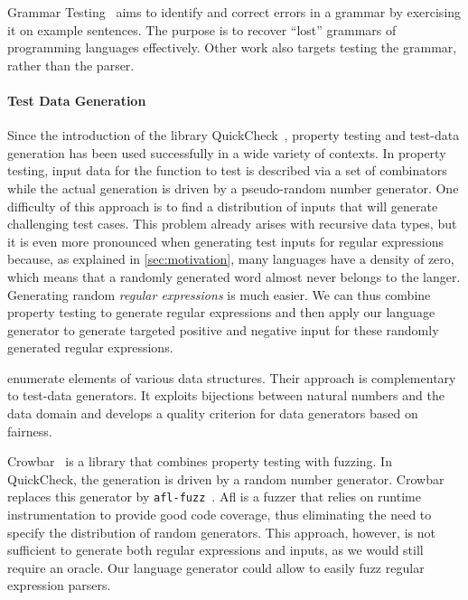 Grammar Testing~\cite{DBLP:conf/fase/Lammel01} aims to
identify and correct errors in a grammar by exercising it on example
sentences. The purpose is to recover ``lost'' grammars of programming
languages effectively.
Other work \cite{DBLP:conf/compsac/LiJLG04} also targets
testing the grammar, rather than the parser.

\paragraph{Test Data Generation}

Since the introduction of the library
QuickCheck~\cite{DBLP:conf/icfp/ClaessenH00}, property testing and
test-data generation has been used successfully in a wide variety of
contexts.  In property testing, input data for the function to test is
described via a set of combinators while the actual generation is
driven by a pseudo-random number generator. One difficulty of this
approach is to find a distribution of inputs that will
generate challenging test cases. This problem already arises with
recursive data types, but it is even more pronounced when generating
test inputs for regular expressions because, as explained in
\cref{sec:motivation}, many languages have a density of zero, which
means that a randomly generated word almost never belongs to the
langer.  Generating random \emph{regular expressions} is much
easier. We can thus combine property testing to generate regular
expressions and then apply our language generator to generate targeted
positive and negative input for these randomly generated regular
expressions.

\citet{DBLP:journals/jfp/NewFFM17} enumerate elements of various data
structures. Their approach is complementary to test-data
generators. It exploits bijections between natural numbers and the
data domain and develops a quality criterion for data generators based
on fairness.

Crowbar~\cite{crowbar} is a library that combines property testing
with fuzzing.  In QuickCheck, the generation is driven by a random
number generator. Crowbar replaces this generator by
\texttt{afl-fuzz}~\cite{afl}. Afl is a fuzzer that relies on runtime
instrumentation to provide good code coverage, thus eliminating the
need to specify the distribution of random generators.  This approach,
however, is not sufficient to generate both regular expressions and
inputs, as we would still require an oracle. Our language generator
could allow to easily fuzz regular expression parsers.



